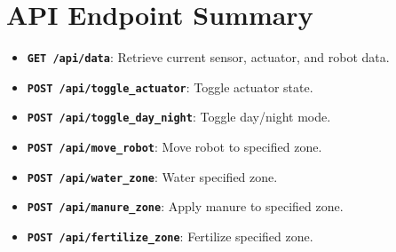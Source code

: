 \documentclass[12pt, a4paper]{report}
\begin{document}
\appendix
\chapter{API Endpoint Summary}
\begin{itemize}
    \item \textbf{\texttt{GET /api/data}}: Retrieve current sensor, actuator, and robot data.
    \item \textbf{\texttt{POST /api/toggle\_actuator}}: Toggle actuator state.
    \item \textbf{\texttt{POST /api/toggle\_day\_night}}: Toggle day/night mode.
    \item \textbf{\texttt{POST /api/move\_robot}}: Move robot to specified zone.
    \item \textbf{\texttt{POST /api/water\_zone}}: Water specified zone.
    \item \textbf{\texttt{POST /api/manure\_zone}}: Apply manure to specified zone.
    \item \textbf{\texttt{POST /api/fertilize\_zone}}: Fertilize specified zone.
\end{itemize}
\end{document}
